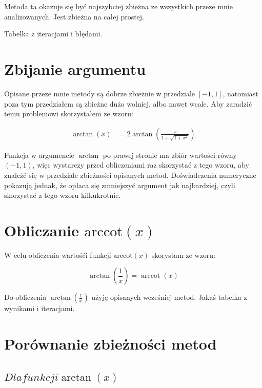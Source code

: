 \documentclass{article}
\begin{document}
Metoda ta okazuje się być najszybciej zbieżna ze wszystkich przeze mnie analizowanych. Jest zbieżna na całej prostej.

Tabelka z iteracjami i błędami.

\section{Zbijanie argumentu}

Opisane przeze mnie metody są dobrze zbieżnie w przedziale $[-1,1]$, natomiast poza tym przedziałem są zbieżne dużo wolniej, albo nawet wcale.
Aby zaradzić temu problemowi skorzystałem ze wzoru:

\begin{equation}
	{\begin{aligned}\arctan(x)&=2\arctan \left({\frac {x}{1+{\sqrt {1+x^{2}}}}}\right)\end{aligned}}
\end{equation}

Funkcja w argumencie $\arctan$ po prawej stronie ma zbiór wartości równy $(-1,1)$, więc wystarczy przed obliczeniami raz skorzystać z tego wzoru, aby znaleźć się w przedziale zbieżności opisanych metod.
Doświadczenia numeryczne pokazują jednak, że opłaca się zmniejszyć argument jak najbardziej, czyli skorzystać z tego wzoru kilkukrotnie.

\section{Obliczanie $\textrm{arccot}(x)$}
W celu obliczenia wartośći funkcji $\textrm{arccot}(x)$ skorystam ze wzoru:

\begin{equation}
\arctan \left({\frac {1}{x}}\right)=\operatorname {arccot}(x)
\end{equation}

Do obliczenia $\arctan(\frac{1}{x})$ użyję opisanych wcześniej metod.
Jakaś tabelka z wynikami i iteracjami.

\clearpage
\section{Porównanie zbieżności metod}
\subsection{$Dla funkcji \arctan(x)$}
\end{document}
